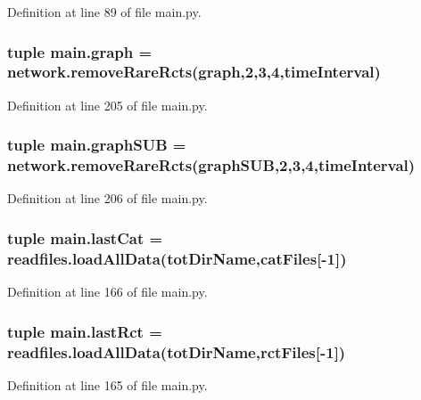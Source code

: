 Definition at line 89 of file main.\-py.

\hypertarget{a00111_a4cfdc01ecc5ad260a4f30c9353e3d856}{
\subsubsection[{graph}]{\setlength{\rightskip}{0pt plus 5cm}tuple main.\-graph = network.\-remove\-Rare\-Rcts(graph,2,3,4,{\bf time\-Interval})}}\label{a00111_a4cfdc01ecc5ad260a4f30c9353e3d856}


Definition at line 205 of file main.\-py.

\hypertarget{a00111_ab96de87bc8cbe59221256af996bdc43e}{
\subsubsection[{graph\-S\-U\-B}]{\setlength{\rightskip}{0pt plus 5cm}tuple main.\-graph\-S\-U\-B = network.\-remove\-Rare\-Rcts(graph\-S\-U\-B,2,3,4,{\bf time\-Interval})}}\label{a00111_ab96de87bc8cbe59221256af996bdc43e}


Definition at line 206 of file main.\-py.

\hypertarget{a00111_ad65fb0887c659a9bf884cba677b67272}{
\subsubsection[{last\-Cat}]{\setlength{\rightskip}{0pt plus 5cm}tuple main.\-last\-Cat = readfiles.\-load\-All\-Data({\bf tot\-Dir\-Name},{\bf cat\-Files}\mbox{[}-\/1\mbox{]})}}\label{a00111_ad65fb0887c659a9bf884cba677b67272}


Definition at line 166 of file main.\-py.

\hypertarget{a00111_a519d451fb14acb6fb50a108ac2b8b261}{
\subsubsection[{last\-Rct}]{\setlength{\rightskip}{0pt plus 5cm}tuple main.\-last\-Rct = readfiles.\-load\-All\-Data({\bf tot\-Dir\-Name},{\bf rct\-Files}\mbox{[}-\/1\mbox{]})}}\label{a00111_a519d451fb14acb6fb50a108ac2b8b261}


Definition at line 165 of file main.\-py.

